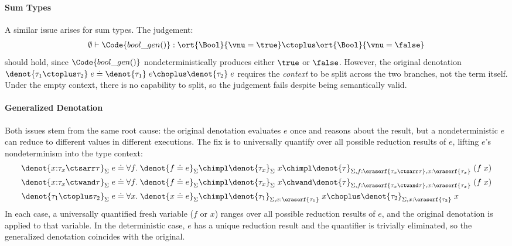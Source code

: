 \paragraph{Sum Types}
A similar issue arises for sum types.  The judgement:
\begin{align*}
  \emptyset \vdash \Code{bool\_gen()} :
  \ort{\Bool}{\vnu = \true} \ctoplus \ort{\Bool}{\vnu = \false}
\end{align*}
should hold, since $\Code{bool\_gen()}$ nondeterministically produces
either $\true$ or $\false$.  However, the original denotation
$\denot{\tau_1 \ctoplus \tau_2}\;e \doteq \denot{\tau_1}\;e \choplus
\denot{\tau_2}\;e$ requires the \emph{context} to be split across the
two branches, not the term itself.  Under the empty context, there is
no capability to split, so the judgement fails despite being
semantically valid.

\paragraph{Generalized Denotation}
Both issues stem from the same root cause: the original denotation
evaluates $e$ once and reasons about the result, but a
nondeterministic $e$ can reduce to different values in different
executions.  The fix is to universally quantify over all possible
reduction results of $e$, lifting $e$'s nondeterminism into the
type context:
\begin{align*}
  \denot{x{:}\tau_x \ctsarr \tau}_\Sigma\;e
    &\doteq \forall f.\; \denot{f \doteq e}_\Sigma \chimpl
             \denot{\tau_x}_\Sigma\;x \chimpl
             \denot{\tau}_{\Sigma,f{:}\eraserf{\tau_x \ctsarr \tau}, x{:}\eraserf{\tau_x}}\;(f\;x)
  \\\denot{x{:}\tau_x \ctwand \tau}_\Sigma\;e
    &\doteq \forall f.\; \denot{f \doteq e}_\Sigma \chimpl
             \denot{\tau_x}_\Sigma\;x \chwand
             \denot{\tau}_{\Sigma,f{:}\eraserf{\tau_x\ctwand \tau}, x{:}\eraserf{\tau_x}}\;(f\;x)
  \\\denot{\tau_1 \ctoplus \tau_2}_\Sigma\;e
    &\doteq \forall x.\; \denot{x \doteq e}_\Sigma \chimpl
             \denot{\tau_1}_{\Sigma,x{:}\eraserf{\tau_1}}\;x \choplus \denot{\tau_2}_{\Sigma,x{:}\eraserf{\tau_2}}\;x
\end{align*}
In each case, a universally quantified fresh variable ($f$ or $x$)
ranges over all possible reduction results of $e$, and the original
denotation is applied to that variable.  In the deterministic case,
$e$ has a unique reduction result and the quantifier is trivially
eliminated, so the generalized denotation coincides with the original.

